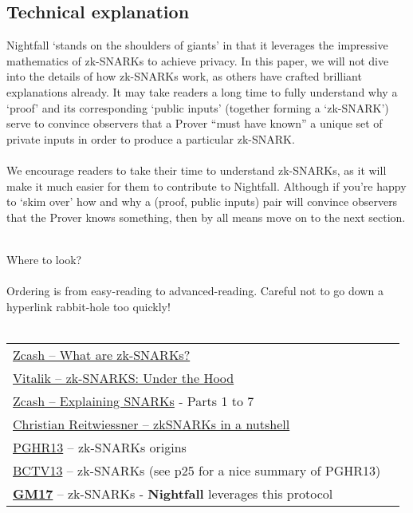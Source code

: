 \documentclass{article}
\begin{document}
\subsection{Technical explanation}
Nightfall `stands on the shoulders of giants' in that it leverages the impressive mathematics of zk-SNARKs to achieve privacy. In this paper, we will not dive into the details of how zk-SNARKs work, as others have crafted brilliant explanations already. It may take readers a long time to fully understand why a `proof' and its corresponding `public inputs' (together forming a `zk-SNARK') serve to convince observers that a Prover ``must have known'' a unique set of private inputs in order to produce a particular zk-SNARK.\\
\\
We encourage readers to take their time to understand zk-SNARKs, as it will make it much easier for them to contribute to Nightfall. Although if you're happy to `skim over' how and why a (proof, public inputs) pair will convince observers that the Prover knows something, then by all means move on to the next section.\\
\\
\begin{center}
  \begin{mdframed}[backgroundcolor=verylightblue]
    Where to look?\\
    \\
    Ordering is from easy-reading to advanced-reading. Careful not to go down a hyperlink rabbit-hole too quickly!\\
    \\
    \begin{tabular}{lp{14cm}}
      \href{https://z.cash/technology/zksnarks/}{Zcash -- What are zk-SNARKs?}\\
      \href{https://medium.com/@VitalikButerin/zk-snarks-under-the-hood-b33151a013f6}{Vitalik -- zk-SNARKS: Under the Hood}\\
      \href{https://z.cash/blog/snark-explain}{Zcash -- Explaining SNARKs} - Parts 1 to 7\\
      \href{https://blog.ethereum.org/2016/12/05/zksnarks-in-a-nutshell/}{Christian Reitwiessner -- zkSNARKs in a nutshell}\\
      \href{https://eprint.iacr.org/2013/279.pdf}{PGHR13} -- zk-SNARKs origins\\
      \href{https://eprint.iacr.org/2013/879.pdf}{BCTV13} -- zk-SNARKs (see p25 for a nice summary of PGHR13)\\
      \href{https://eprint.iacr.org/2017/540.pdf}{\textbf{GM17}} -- zk-SNARKs - \textbf{Nightfall} leverages this protocol
    \end{tabular}
  \end{mdframed}
\end{center}
\end{document}
